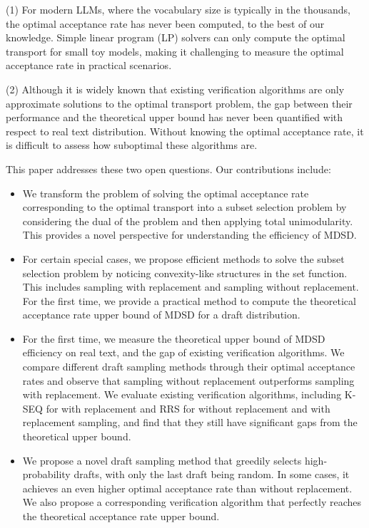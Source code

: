 \documentclass{article}
\makeatletter
\newcommand{\crvspace}{\@ifstar\crvspacestar\crvspacenostar}
\newcommand{\crvspacenostar}[1]{}
\newcommand{\crvspacestar}[1]{}
\makeatother
\begin{document}
(1) For modern LLMs, where the vocabulary size is typically in the thousands, the optimal acceptance rate has never been computed, to the best of our knowledge. Simple linear program (LP) solvers can only compute the optimal transport for small toy models, making it challenging to measure the optimal acceptance rate in practical scenarios.

(2) Although it is widely known that existing verification algorithms are only approximate solutions to the optimal transport problem, the gap between their performance and the theoretical upper bound has never been quantified with respect to real text distribution. Without knowing the optimal acceptance rate, it is difficult to assess how suboptimal these algorithms are.

This paper addresses these two open questions. Our contributions include:
\crvspace{-5pt}
\begin{itemize}[leftmargin=*]
\item We transform the problem of solving the optimal acceptance rate corresponding to the optimal transport into a subset selection problem by considering the dual of the problem and then applying total unimodularity. This provides a novel perspective for understanding the efficiency of MDSD.
\item For certain special cases, we propose efficient methods to solve the subset selection problem by noticing convexity-like structures in the set function. This includes sampling with replacement and sampling without replacement. For the first time, we provide a practical method to compute the theoretical acceptance rate upper bound of MDSD for a draft distribution.
\item For the first time, we measure the theoretical upper bound of MDSD efficiency on real text, and the gap of existing verification algorithms. We compare different draft sampling methods through their optimal acceptance rates and observe that sampling without replacement outperforms sampling with replacement. We evaluate existing verification algorithms, including K-SEQ for with replacement and RRS for without replacement and with replacement sampling, and find that they still have significant gaps from the theoretical upper bound.
\item We propose a novel draft sampling method that greedily selects high-probability drafts, with only the last draft being random. In some cases, it achieves an even higher optimal acceptance rate than without replacement. We also propose a corresponding verification algorithm that perfectly reaches the theoretical acceptance rate upper bound.
\end{itemize}
\end{document}
